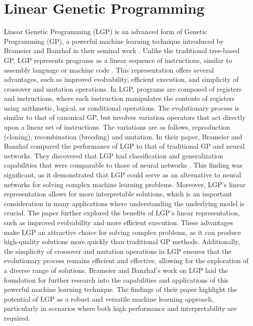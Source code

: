 \documentclass[12pt]{report}
\begin{document}
\section{Linear Genetic Programming}
Linear Genetic Programming (LGP) is an advanced form of Genetic Programming (GP), a powerful machine learning technique introduced by Brameier and Banzhaf in their seminal work \cite{brameier2001comparison}. Unlike the traditional tree-based GP, LGP represents programs as a linear sequence of instructions, similar to assembly language or machine code \cite{koza93}. This representation offers several advantages, such as improved evolvability, efficient execution, and simplicity of crossover and mutation operations.
In LGP, programs are composed of registers and instructions, where each instruction manipulates the contents of registers using arithmetic, logical, or conditional operations. The evolutionary process is similar to that of canonical GP, but involves variation operators that act directly upon a linear set of instructions. The variations are as follows, reproduction (cloning), recombination (breeding) and mutation.
In their paper, Brameier and Banzhaf compared the performance of LGP to that of traditional GP and neural networks. They discovered that LGP had classification and generalization capabilities that were comparable to those of neural networks \cite{brameier2001comparison}. This finding was significant, as it demonstrated that LGP could serve as an alternative to neural networks for solving complex machine learning problems. Moreover, LGP's linear representation allows for more interpretable solutions, which is an important consideration in many applications where understanding the underlying model is crucial.
The paper further explored the benefits of LGP's linear representation, such as improved evolvability and more efficient execution. These advantages make LGP an attractive choice for solving complex problems, as it can produce high-quality solutions more quickly than traditional GP methods. Additionally, the simplicity of crossover and mutation operations in LGP ensures that the evolutionary process remains efficient and effective, allowing for the exploration of a diverse range of solutions.
Brameier and Banzhaf's work on LGP laid the foundation for further research into the capabilities and applications of this powerful machine learning technique. The findings of their paper highlight the potential of LGP as a robust and versatile machine learning approach, particularly in scenarios where both high performance and interpretability are required.
\end{document}

